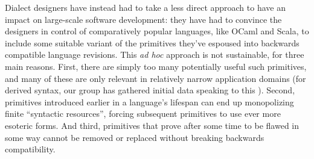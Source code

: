 Dialect designers have instead had to take a less direct approach to have an impact on large-scale software development: they have had to convince the designers in control of comparatively popular languages, like OCaml and Scala, to include some suitable variant of the primitives they've espoused into backwards compatible language revisions. %
This \emph{ad hoc} approach is not sustainable, for three main reasons. First,  there are simply too  many potentially useful such primitives, and many of these are only relevant in relatively narrow application domains (for derived syntax, our group has  gathered initial data speaking to this \cite{TSLs}). Second, primitives introduced earlier in a language's lifespan can end up monopolizing finite ``syntactic resources'', forcing subsequent primitives to use ever more esoteric forms. And third, primitives that prove after some time to be flawed in some way cannot be removed or replaced without breaking backwards compatibility. %

